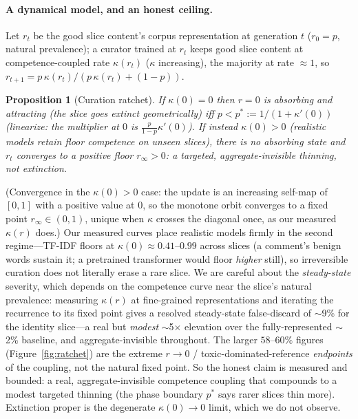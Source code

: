 \documentclass[conference]{IEEEtran}
\newtheorem{proposition}{Proposition}
\begin{document}
\paragraph{A dynamical model, and an honest ceiling.} Let $r_t$ be the good slice content's corpus
representation at generation $t$ ($r_0=p$, natural prevalence); a curator trained at $r_t$ keeps good slice
content at competence-coupled rate $\kappa(r_t)$ ($\kappa$ increasing), the majority at rate $\approx1$, so
$r_{t+1}=p\,\kappa(r_t)/\!\left(p\,\kappa(r_t)+(1-p)\right)$.
\begin{proposition}[Curation ratchet]\label{prop:ratchet}
If $\kappa(0)=0$ then $r{=}0$ is absorbing and attracting (the slice goes extinct geometrically) iff
$p<p^\ast:=1/(1+\kappa'(0))$ (linearize: the multiplier at $0$ is $\tfrac{p}{1-p}\kappa'(0)$). If instead $\kappa(0)>0$
(realistic models retain floor competence on unseen slices), there is no absorbing state and $r_t$ converges to
a positive floor $r_\infty>0$: a targeted, aggregate-invisible \emph{thinning}, not extinction.
\end{proposition}
\noindent (Convergence in the $\kappa(0)>0$ case: the update is an increasing self-map of $[0,1]$ with a
positive value at $0$, so the monotone orbit converges to a fixed point $r_\infty\in(0,1)$, unique when
$\kappa$ crosses the diagonal once, as our measured $\kappa(r)$ does.)
Our measured curves place realistic models firmly in the second regime---TF-IDF floors at
$\kappa(0)\!\approx\!0.41$--$0.99$ across slices (a comment's benign words sustain it; a pretrained transformer would floor
\emph{higher} still), so irreversible curation does not literally erase a rare slice. We are careful about the
\emph{steady-state} severity, which depends on the competence curve near the slice's natural prevalence: measuring
$\kappa(r)$ at fine-grained representations and iterating the recurrence to its fixed point gives a resolved
steady-state false-discard of $\sim$9\% for the identity slice---a real but \emph{modest} $\sim$5$\times$
elevation over the fully-represented $\sim$2\% baseline, and aggregate-invisible throughout. The larger
$58$--$60\%$ figures (Figure~\ref{fig:ratchet}) are the extreme $r\!\to\!0$ / toxic-dominated-reference
\emph{endpoints} of the coupling, not the natural fixed point. So the honest claim is measured and bounded: a
real, aggregate-invisible competence coupling that compounds to a modest targeted thinning (the phase boundary
$p^\ast$ says rarer slices thin more). Extinction proper is the degenerate
$\kappa(0)\!\to\!0$ limit, which we do not observe.
\end{document}
